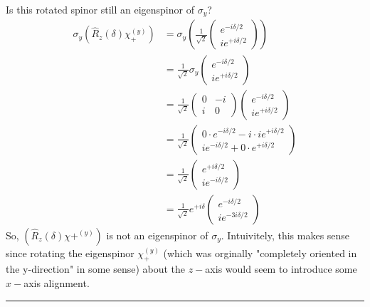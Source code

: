 \documentclass{article}
\begin{document}
\begin{enumerate}[label=(\alph*)]
  Is this rotated spinor still an eigenspinor of $\sigma_y$?
  \begin{align*}
    \sigma_y \left( \hat{R}_z(\delta)\chi_+^{(y)} \right) &= \sigma_y \left( \frac{1}{\sqrt{2}} \begin{pmatrix}
      e^{-i\delta / 2} \\
      i e^{+i\delta / 2}
    \end{pmatrix} \right) \\
    &= \frac{1}{\sqrt{2}} \sigma_y \begin{pmatrix}
      e^{-i\delta / 2} \\
      i e^{+i\delta / 2}
    \end{pmatrix} \\
    &= \frac{1}{\sqrt{2}} \begin{pmatrix} 0 & -i \\ i & 0 \end{pmatrix} \begin{pmatrix}
      e^{-i\delta / 2} \\
      i e^{+i\delta / 2}
    \end{pmatrix} \\
    &= \frac{1}{\sqrt{2}} \begin{pmatrix}
      0 \cdot e^{-i\delta / 2}  -i \cdot ie^{+ i\delta / 2} \\
      i e^{-i\delta / 2} + 0 \cdot e^{+i \delta / 2}
    \end{pmatrix} \\
    &= \frac{1}{\sqrt{2}} \begin{pmatrix}
      e^{+ i\delta / 2} \\
      i e^{-i\delta / 2}
    \end{pmatrix} \\
    &= \frac{1}{\sqrt{2}} e^{+i \delta} 
    \begin{pmatrix}
      e^{-i \delta / 2} \\
      i e^{-3i \delta / 2 }
    \end{pmatrix}
  \end{align*}
  So, $\left( \hat{R}_z(\delta) \chi+^{(y)} \right)$ is not an eigenspinor of $\sigma_y$. Intuivitely, this makes sense since rotating the eigenspinor $\chi_+^{(y)}$ (which was orginally "completely oriented in the y-direction" in some sense) about the $z-$axis would seem to introduce some $x-$axis alignment.
\end{enumerate}

\vskip 0.5cm 
\hrule 
\pagebreak
\end{document}
